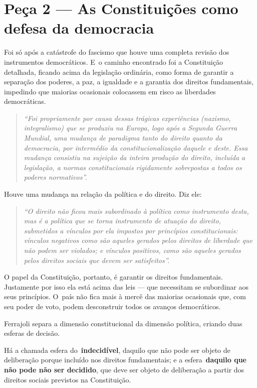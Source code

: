 \section{Peça 2 --- As Constituições como defesa da democracia}

Foi só após a catástrofe do fascismo que houve uma completa revisão dos
instrumentos democráticos. E~o caminho encontrado foi a Constituição
detalhada, ficando acima da legislação ordinária, como forma de garantir
a separação dos poderes, a paz, a igualdade e a garantia dos direitos
fundamentais, impedindo que maiorias ocasionais colocassem em risco as
liberdades democráticas.

\begin{quote}
 \emph{``Foi propriamente por causa dessas trágicas experiências
(nazismo, integralismo) que se produziu na Europa, logo após a Segunda
Guerra Mundial, uma mudança de paradigma tanto do direito quanto da
democracia, por intermédio da constitucionalização daquele e deste. Essa
mudança consistiu na sujeição da inteira produção do direito, incluída a
legislação, a normas constitucionais rigidamente sobrepostas a todos os
poderes normativos''.}
\end{quote}

Houve uma mudança na relação da política e do direito. Diz ele:

\begin{quote}
\emph{``O direito não ficou mais subordinado à política como instrumento
desta, mas é a política que se torna instrumento de atuação do direito,
submetidos a vínculos por ela impostos por princípios constitucionais:
vínculos negativos como são aqueles gerados pelos direitos de liberdade
que não podem ser violados; e vínculos positivos, como são aqueles
gerados pelos direitos sociais que devem ser satisfeitos''.}
\end{quote}

O papel da Constituição, portanto, é garantir os direitos fundamentais.
Justamente por isso ela está acima das leis --- que necessitam se
subordinar aos seus princípios. O~país não fica mais à mercê das
maiorias ocasionais que, com seu poder de voto, podem desconstruir todos
os avanços democráticos.

Ferrajoli separa a dimensão constitucional da dimensão política, criando
duas esferas de decisão.

Há a chamada esfera do~\textbf{indecidível}, daquilo que não pode ser
objeto de deliberação porque incluído nos direitos fundamentais; e a
esfera~\textbf{daquilo que não pode não ser decidido}, que deve ser
objeto de deliberação a partir dos direitos sociais previstos na
Constituição.

